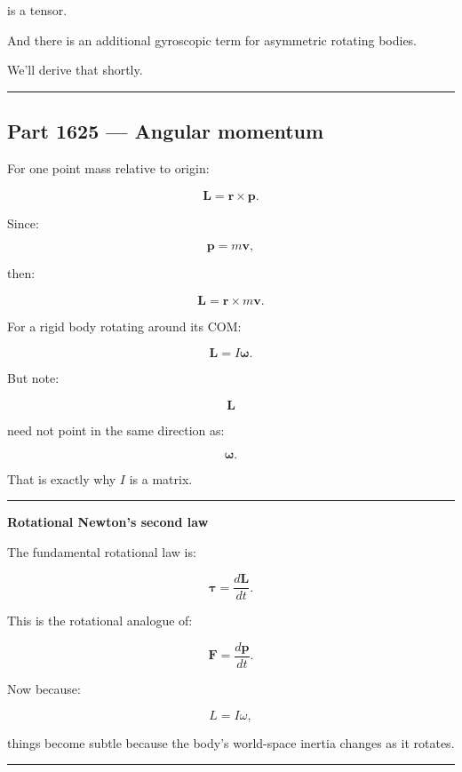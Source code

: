 is a tensor.

And there is an additional gyroscopic term for asymmetric rotating bodies.

We'll derive that shortly.

\begin{center}\rule{0.5\linewidth}{0.5pt}\end{center}

\subsection{Part 1625 --- Angular momentum}\label{06-engine-ii-ch035-part-1625-angular-momentum}

\hypertarget{06-engine-ii-ch035-part-1625-angular-momentum}{}

For one point mass relative to origin:

\[
\boxed{
\mathbf{L}
=
\mathbf{r}\times\mathbf{p}.
}
\]

Since:

\[
\mathbf{p}=m\mathbf{v},
\]

then:

\[
\mathbf{L}
=
\mathbf{r}\times
m\mathbf{v}.
\]

For a rigid body rotating around its COM:

\[
\boxed{
\mathbf{L}
=
I\boldsymbol{\omega}.
}
\]

But note:

\[
\mathbf{L}
\]

need not point in the same direction as:

\[
\boldsymbol{\omega}.
\]

That is exactly why \(I\) is a matrix.

\begin{center}\rule{0.5\linewidth}{0.5pt}\end{center}

\textbf{Rotational Newton's second law}

The fundamental rotational law is:

\[
\boxed{
\boldsymbol{\tau}
=
\frac{d\mathbf{L}}{dt}.
}
\]

This is the rotational analogue of:

\[
\mathbf{F}
=
\frac{d\mathbf{p}}{dt}.
\]

Now because:

\[
L=I\omega,
\]

things become subtle because the body's world-space inertia changes as it rotates.

\begin{center}\rule{0.5\linewidth}{0.5pt}\end{center}

